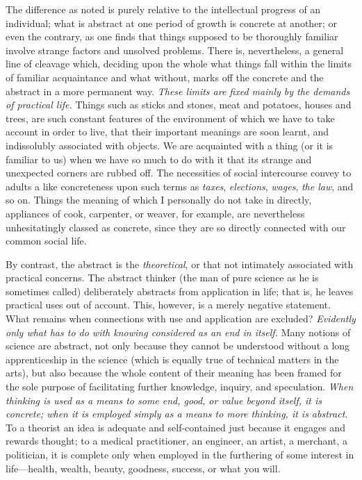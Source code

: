\documentclass[showtrims,ustradepaper]{memoir}
\begin{document}

The difference as noted is purely relative to the intellectual progress
of an individual; what is
abstract
at one period of growth is concrete at another; or even the contrary, as
one finds that things supposed to be thoroughly familiar involve strange
factors and unsolved problems. There is, nevertheless, a general line of
cleavage which, deciding upon the whole what things fall within the
limits of familiar acquaintance and what without, marks off the concrete
and the abstract in a more permanent way. \emph{These limits are fixed
mainly by the demands of practical life.} Things such as sticks and
stones, meat and potatoes, houses and trees, are such constant features
of the environment of which we have to take account in order to live,
that their important meanings are soon learnt, and indissolubly
associated with objects. We are acquainted with a thing (or it is
familiar to us) when we have so much to do with it that its strange and
unexpected corners are rubbed off. The necessities of social intercourse
convey to adults a like concreteness upon such terms as \emph{taxes},
\emph{elections}, \emph{wages}, \emph{the law}, and so on. Things the
meaning of which I personally do not take in directly, appliances of
cook, carpenter, or weaver, for example, are nevertheless unhesitatingly
classed as concrete, since they are so directly connected with our
common social life.


By contrast, the abstract is the \emph{theoretical}, or that not
intimately associated with practical concerns. The abstract thinker (the
man of pure science as he is sometimes called) deliberately abstracts
from application in life; that is, he leaves practical uses out of
account. This, however, is a merely negative statement. What remains
when connections with use and application are excluded? \emph{Evidently
only what has to do with knowing considered as an end in itself.} Many
notions of
science
are abstract, not only because they cannot be understood without a long
apprenticeship in the science (which is equally true of technical
matters in the arts), but also because the whole content of their
meaning has been framed for the sole purpose of facilitating further
knowledge, inquiry, and speculation. \emph{When thinking is used as a
means to some end, good, or value beyond itself, it is concrete; when it
is employed simply as a means to more thinking, it is abstract.} To a
theorist an idea is adequate and self-contained just because it engages
and rewards thought; to a medical practitioner, an engineer, an artist,
a merchant, a politician, it is complete only when employed in the
furthering of some interest in life---health, wealth, beauty, goodness,
success, or what you will.
\end{document}
